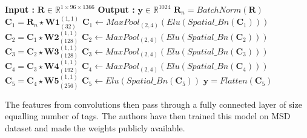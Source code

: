 \begin{algorithm}
  \caption{$\textbf{y}$ = $CHOI\_CNN(\textbf{R})$ }
  \label{alg:choicnn}      
  \begin{algorithmic}[1]
   \Statex \textbf{Input :} $\textbf{R} \in \mathbb{R}^{1 \times 96 \times 1366}$
   \Statex \textbf{Output :} $\textbf{y} \in \mathbb{R}^{1024}$ 
   \State $\textbf{R}_{n} = BatchNorm(\textbf{R})$
   \State $\textbf{C}_{1} = \textbf{R}_{n}\star\textbf{W1}_{(32)}^{(1,1)}$ 
   \State $\textbf{C}_{1} \leftarrow MaxPool_{(2,4)}(Elu(Spatial\_Bn(\textbf{C}_{1})))$ 
      \State $\textbf{C}_{2} = \textbf{C}_{1}\star\textbf{W2}_{(128)}^{(1,1)}$ 
   \State $\textbf{C}_{2} \leftarrow MaxPool_{(2,4)}(Elu(Spatial\_Bn(\textbf{C}_{2})))$ 
         \State $\textbf{C}_{3} = \textbf{C}_{2}\star\textbf{W3}_{(128)}^{(1,1)}$ 
   \State $\textbf{C}_{3} \leftarrow MaxPool_{(2,4)}(Elu(Spatial\_Bn(\textbf{C}_{3})))$ 
         \State $\textbf{C}_{4} = \textbf{C}_{3}\star\textbf{W4}_{(192)}^{(1,1)}$ 
   \State $\textbf{C}_{4} \leftarrow MaxPool_{(2,4)}(Elu(Spatial\_Bn(\textbf{C}_{4})))$ 
         \State $\textbf{C}_{5} = \textbf{C}_{4}\star\textbf{W5}_{(256)}^{(1,1)}$ 
   \State $\textbf{C}_{5} \leftarrow Elu(Spatial\_Bn(\textbf{C}_{5}))$ 
   \State $\textbf{y} = Flatten(\textbf{C}_{5})$ 
  \end{algorithmic}
\end{algorithm}
\FloatBarrier

\noindent The features from convolutions then pass through a fully connected layer of size equalling  number of tags. The authors have then trained this model on MSD dataset and made the weights publicly available.

